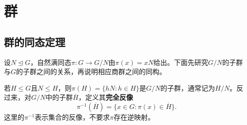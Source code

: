 \chapter{群}
\label{p2:ch2}


\section{群的同态定理}

设$N\trianglelefteq G$，自然满同态$\pi:G\to G/N$由$\pi(x)=xN$给出。下面先研究$G/N$的子群与$G$的子群之间的关系，再说明相应商群之间的同构。

\label{p2:concept:c2-l12}若$H\leq G$且$N\leq H$，则$\pi(H)=\{hN:h\in H\}$是$G/N$的子群，通常记为$H/N$。反过来，对$G/N$中的子群$\overline H$，定义其\textbf{完全反像}
\[
\pi^{-1}(\overline H)=\{x\in G:\pi(x)\in\overline H\}.
\]
这里的$\pi^{-1}$表示集合的反像，不要求$\pi$存在逆映射。

